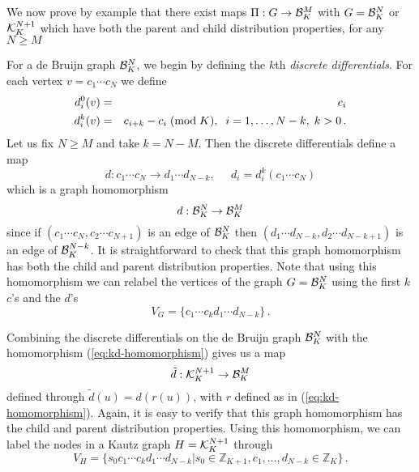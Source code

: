 \documentclass[12pt]{article}
\def\bbz{{\mathbb Z}}
\begin{document}
We now prove by example that there exist maps 
$\Pi:G \rightarrow {\cal B}_K^M$ with
$G ={\cal
B}_K^N$ or ${\cal K}_K^{N + 1}$ which have both the parent and child
distribution properties, for any $N \geq M$


For a de Bruijn graph ${\cal B}_K^N$, we begin by defining the $k$th
{\it discrete 
differentials}.  For each vertex $v = c_1 \cdots c_N$ we define
\begin{eqnarray}
d^0_i (v)  &= & c_i \nonumber\\
d^k_{i} (v) & = & c_{i + k} - c_i \; ({\rm mod}\; K),  \; \;
i = 1, \ldots, N -k, \; k > 0 \,. \label{eq:dcc}
\end{eqnarray}
Let us fix $N\geq M$  and take $k = N -M$.
Then the discrete 
differentials define a map
\begin{equation}
d: c_1 \cdots c_N \rightarrow d_1 \cdots d_{N -k}, \;\;\;\;\;
d_i = d^k_i (c_1 \cdots c_N)
\end{equation}
which is a graph homomorphism
\begin{equation}
d:{\cal B}_K^N \rightarrow{\cal B}_{K}^{M}
\label{eq:dd-map}
\end{equation}
since if $(c_1 \cdots c_N, c_2 \cdots c_{N + 1})$ is an edge of ${\cal
  B}_K^N$ then $(d_1 \cdots d_{N-k}, d_2 \cdots d_{N-k + 1})$ is an
  edge of ${\cal B}_K^{N -k}$.
It is straightforward to check that this graph homomorphism has both
  the child and parent distribution properties.   
Note that using this homomorphism we can relabel the vertices of the graph
 $G ={\cal B}_K^N$
  using the first $k$ $c$'s and the $d$'s
\begin{equation}
V_{G} =\{c_1 \cdots c_{k} d_1 \cdots d_{N -k}\} \,.
\label{eq:labeling-d}
\end{equation}

Combining the discrete differentials on the de Bruijn graph
${\cal B}_K^N$ with the homomorphism
(\ref{eq:kd-homomorphism}) 
gives us a map 
\begin{equation}
\tilde{d}:{\cal K}_K^{N + 1} \rightarrow{\cal B}_K^M
\label{eq:dd-Kautz}
\end{equation}
defined through $\tilde{d}(u) = d (r (u))$, with $r$ defined as in
(\ref{eq:kd-homomorphism}).  
Again, it is easy to
verify that this graph homomorphism has the child and parent
distribution properties.
Using this homomorphism, we
can label the nodes in a Kautz graph
$H ={\cal K}_K^{N + 1}$ through
\begin{equation}
V_{H} =\{s_0 c_1 \cdots c_{k} d_1 \cdots d_{N -k}
| s_0 \in\bbz_{K + 1}, c_1, \ldots, d_{N -k} \in\bbz_K\} \,.
\label{eq:labeling-k}
\end{equation}
\vspace*{0.1in}
\end{document}

